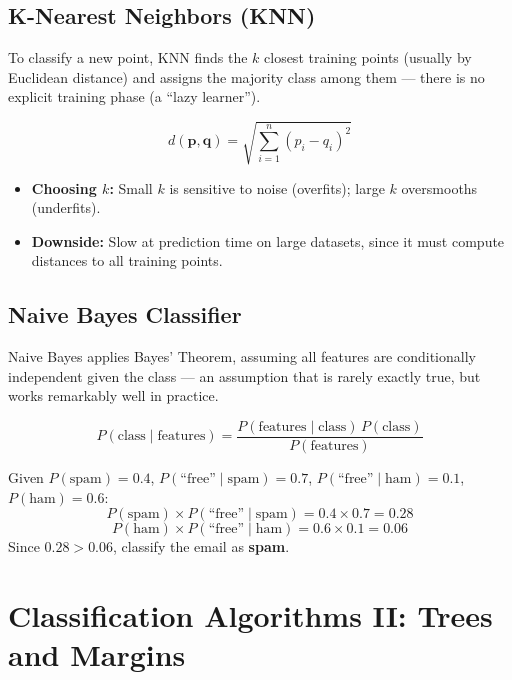 \documentclass[11pt,a4paper]{article}
\begin{document}
\subsection{K-Nearest Neighbors (KNN)}
\begin{conceptbox}
To classify a new point, KNN finds the $k$ closest training points (usually by Euclidean distance) and assigns the majority class among them --- there is no explicit training phase (a ``lazy learner'').
\end{conceptbox}
$$
d(\mathbf{p}, \mathbf{q}) = \sqrt{\sum_{i=1}^{n}(p_i - q_i)^2}
$$
\begin{itemize}[leftmargin=*]
  \item \textbf{Choosing $k$:} Small $k$ is sensitive to noise (overfits); large $k$ oversmooths (underfits).
  \item \textbf{Downside:} Slow at prediction time on large datasets, since it must compute distances to all training points.
\end{itemize}

\subsection{Naive Bayes Classifier}
\begin{definitionbox}
Naive Bayes applies Bayes' Theorem, assuming all features are conditionally independent given the class --- an assumption that is rarely exactly true, but works remarkably well in practice.
\end{definitionbox}
$$
P(\text{class} \mid \text{features}) = \frac{P(\text{features} \mid \text{class})\, P(\text{class})}{P(\text{features})}
$$
\begin{examplebox}
Given $P(\text{spam})=0.4$, $P(\text{``free''}\mid\text{spam})=0.7$, $P(\text{``free''}\mid\text{ham})=0.1$, $P(\text{ham})=0.6$:
$$
P(\text{spam})\times P(\text{``free''}\mid\text{spam}) = 0.4\times0.7 = 0.28
$$
$$
P(\text{ham})\times P(\text{``free''}\mid\text{ham}) = 0.6\times0.1 = 0.06
$$
Since $0.28 > 0.06$, classify the email as \textbf{spam}.
\end{examplebox}

\section{Classification Algorithms II: Trees and Margins}
\end{document}
